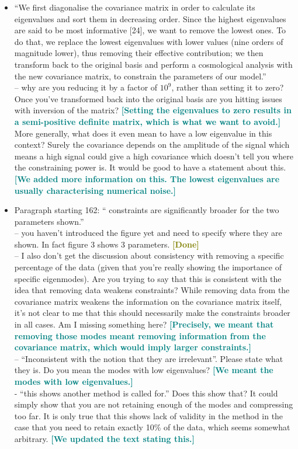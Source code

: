 \documentclass{article}
\newcommand\reply[1]{{\bf {\textcolor{teal}{[#1]}}}}
\newcommand\done{{\bf {\textcolor{olive}{[Done]}}}}
\begin{document}
\begin{itemize}
		
		\item “We first diagonalise the covariance matrix in order to calculate its eigenvalues and sort them in decreasing order. Since the highest eigenvalues are said to be most informative [24], we want to remove the lowest ones. To do that, we replace the lowest eigenvalues with lower values (nine orders of magnitude lower), thus removing their effective contribution; we then transform back to the original basis and perform a cosmological analysis with the new covariance matrix, to constrain the parameters of our model.” \\ 
		– why are you reducing it by a factor of $10^9$, rather than setting it to zero? Once you’ve transformed back into the original basis are you hitting issues with inversion of the matrix? \reply{Setting the eigenvalues to zero results in a semi-positive definite matrix, which is what we want to avoid.} \\
		More generally, what does it even mean to have a low eigenvalue in this context? Surely the covariance depends on the amplitude of the signal which means a high signal could give a high covariance which doesn’t tell you where the constraining power is. It would be good to have a statement about this. \reply{We added more information on this. The lowest eigenvalues are usually characterising numerical noise.}
		
		\item Paragraph starting 162: “ constraints are significantly broader for the two parameters shown.” \\ 
		– you haven’t introduced the figure yet and need to specify where they are shown. In fact figure 3 shows 3 parameters. \done \\ 
		– I also don’t get the discussion about consistency with removing a specific percentage of the data (given that you’re really showing the importance of specific eigenmodes). Are you trying to say that this is consistent with the idea that removing data weakens constraints? While removing data from the covariance matrix weakens the information on the covariance matrix itself, it’s not clear to me that this should necessarily make the constraints broader in all cases. Am I missing something here? \reply{Precisely, we meant that removing those modes meant removing information from the covariance matrix, which would imply larger constraints.}\\ 
		– “Inconsistent with the notion that they are irrelevant”. Please state what they is. Do you mean the modes with low eigenvalues? \reply{We meant the modes with low eigenvalues.} \\
		- “this shows another method is called for.” Does this show that? It could simply show that you are not retaining enough of the modes and compressing too far. It is only true that this shows lack of validity in the method in the case that you need to retain exactly 10\% of the data, which seems somewhat arbitrary. \reply{We updated the text stating this.}
		

\end{itemize}
\end{document}
